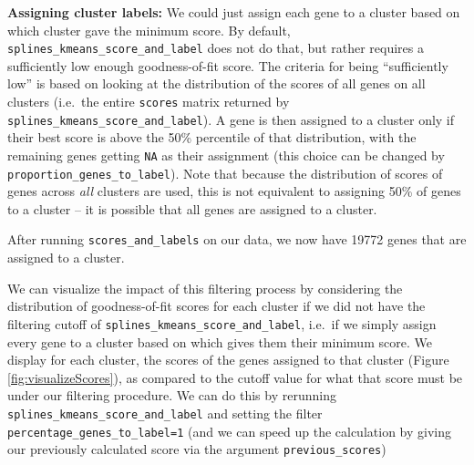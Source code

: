 \documentclass[9pt,a4paper,]{extarticle}
\newenvironment{Shaded}{\begin{snugshade}}{\end{snugshade}}
\newcommand{\CommentTok}[1]{\textcolor[rgb]{0.56,0.35,0.01}{\textit{#1}}}
\newcommand{\KeywordTok}[1]{\textcolor[rgb]{0.13,0.29,0.53}{\textbf{#1}}}
\newcommand{\NormalTok}[1]{#1}
\newcommand{\OperatorTok}[1]{\textcolor[rgb]{0.81,0.36,0.00}{\textbf{#1}}}
\newcommand{\StringTok}[1]{\textcolor[rgb]{0.31,0.60,0.02}{#1}}
\begin{document}
\textbf{Assigning cluster labels:} We could just assign each gene to a cluster
based on which cluster gave the minimum score. By default,
\texttt{splines\_kmeans\_score\_and\_label} does not do that, but rather requires a
sufficiently low enough goodness-of-fit score. The criteria for being
``sufficiently low'' is based on looking at the distribution of the scores of
all genes on all clusters (i.e.~the entire \texttt{scores} matrix returned by
\texttt{splines\_kmeans\_score\_and\_label}). A gene is then assigned to a cluster only
if their best score is above the 50\% percentile of that distribution, with the
remaining genes getting \texttt{NA} as their assignment (this choice can be changed
by \texttt{proportion\_genes\_to\_label}). Note that because the distribution of scores
of genes across \emph{all} clusters are used, this is not equivalent to assigning
50\% of genes to a cluster -- it is possible that all genes are assigned to a
cluster.

\begin{Shaded}
\end{Shaded}

After running \texttt{scores\_and\_labels} on our data, we now have 19772 genes that
are assigned to a cluster.

We can visualize the impact of this filtering process by considering the
distribution of goodness-of-fit scores for each cluster if we did not have the
filtering cutoff of \texttt{splines\_kmeans\_score\_and\_label}, i.e.~if we simply assign
every gene to a cluster based on which gives them their minimum score. We
display for each cluster, the scores of the genes assigned to that cluster
(Figure \ref{fig:visualizeScores}), as compared to the cutoff value for what
that score must be under our filtering procedure. We can do this by rerunning
\texttt{splines\_kmeans\_score\_and\_label} and setting the filter
\texttt{percentage\_genes\_to\_label=1} (and we can speed up the calculation by giving
our previously calculated score via the argument \texttt{previous\_scores})
\end{document}
